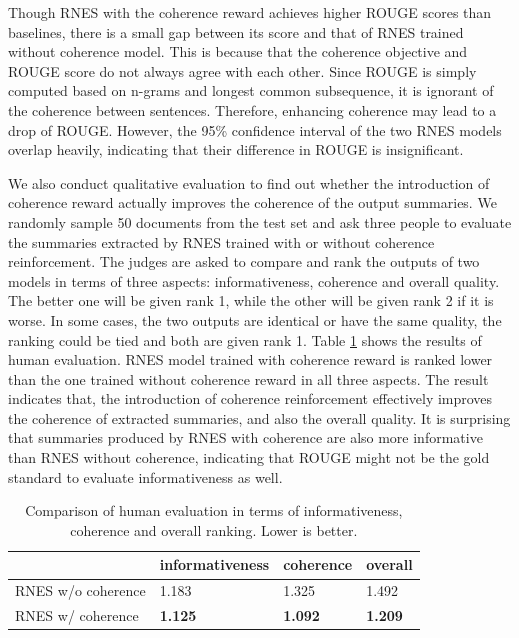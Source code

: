\documentclass[letterpaper]{article} %
\begin{document}
	Though RNES with the coherence reward achieves higher ROUGE scores than baselines, there is a small gap between its score and that of RNES trained without coherence model. This is because that the coherence objective and ROUGE score do not always agree with each other. Since ROUGE is simply computed based on n-grams and longest common subsequence, it is ignorant of the coherence between sentences. Therefore, enhancing coherence may lead to a drop of ROUGE. However, the 95\% confidence interval of the two RNES models overlap heavily, indicating that their difference in ROUGE is insignificant. 
	
	We also conduct qualitative evaluation to find out whether the introduction of coherence reward actually improves the coherence of the output summaries. We randomly sample 50 documents from the test set and ask three people to evaluate the summaries extracted by RNES trained with or without coherence reinforcement. The judges are asked to compare and rank the outputs of two models in terms of three aspects: informativeness, coherence and overall quality. The better one will be given rank 1, while the other will be given rank 2 if it is worse. In some cases, the two outputs are identical or have the same quality, the ranking could be tied and both are given rank 1. Table \ref{tab:human_eval} shows the results of human evaluation. RNES model trained with coherence reward is ranked lower than the one trained without coherence reward in all three aspects. The result indicates that, the introduction of coherence reinforcement effectively improves the coherence of extracted summaries, and also the overall quality. It is surprising that summaries produced by RNES with coherence are also more informative than RNES without coherence, indicating that ROUGE might not be the gold standard to evaluate informativeness as well. 
	
	\begin{table}[ht]
	\centering
	\caption{Comparison of human evaluation in terms of informativeness, coherence and overall ranking. Lower is better.}
	\label{tab:human_eval}
	
	\begin{tabular}{|p{16mm}|p{22mm}|p{15mm}|p{10mm}|}
		\hline
		&informativeness&coherence&overall\\\hline
		RNES w/o coherence&1.183&1.325&1.492 \\
		RNES w/ coherence& \textbf{1.125} & \textbf{1.092} & \textbf{1.209} \\\hline
	\end{tabular}
	\end{table}	
	
\end{document}
